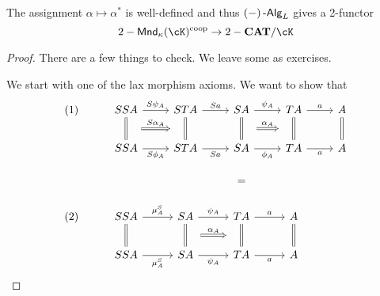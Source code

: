 \documentclass[a4paper,11pt,oneside,openany]{scrbook}
\begin{document}
\begin{prop}
    The assignment $\alpha\mapsto\alpha^*$ is well-defined and thus $(-)\operatorname{-\mathsf{Alg}}_L$
    gives a 2-functor
    \[2-\Mnd_\kappa(\cK)^{\text{coop}}\rightarrow 2-\CAT/\cK\]
\end{prop}
\begin{proof}
    There are a few things to check. We leave some as exercises.

    We start with one of the lax morphism axioms. We want to show that
    \[\begin{tikzcd}
        {(1)} & SSA & STA & SA & TA & A \\
        & SSA & STA & SA & TA & A \\
        &&& {=} \\
        {(2)} & SSA & SA & TA & A \\
        & SSA & SA & TA & A
        \arrow[""{name=0, anchor=center, inner sep=0}, Rightarrow, no head, from=1-4, to=2-4]
        \arrow[""{name=1, anchor=center, inner sep=0}, Rightarrow, no head, from=1-5, to=2-5]
        \arrow[Rightarrow, no head, from=1-6, to=2-6]
        \arrow["a", from=1-5, to=1-6]
        \arrow["a"', from=2-5, to=2-6]
        \arrow["{\psi_A}", from=1-4, to=1-5]
        \arrow["{\phi_A}"', from=2-4, to=2-5]
        \arrow["{S\psi_A}", from=1-2, to=1-3]
        \arrow["{S\phi_A}"', from=2-2, to=2-3]
        \arrow["Sa"', from=2-3, to=2-4]
        \arrow["Sa", from=1-3, to=1-4]
        \arrow[""{name=2, anchor=center, inner sep=0}, Rightarrow, no head, from=1-2, to=2-2]
        \arrow[""{name=3, anchor=center, inner sep=0}, Rightarrow, no head, from=1-3, to=2-3]
        \arrow[Rightarrow, no head, from=4-5, to=5-5]
        \arrow[""{name=4, anchor=center, inner sep=0}, Rightarrow, no head, from=4-4, to=5-4]
        \arrow[""{name=5, anchor=center, inner sep=0}, Rightarrow, no head, from=4-3, to=5-3]
        \arrow[Rightarrow, no head, from=4-2, to=5-2]
        \arrow["{\mu_A^S}", from=4-2, to=4-3]
        \arrow["{\psi_A}", from=4-3, to=4-4]
        \arrow["a", from=4-4, to=4-5]
        \arrow["a"', from=5-4, to=5-5]
        \arrow["{\psi_A}"', from=5-3, to=5-4]
        \arrow["{\mu^S_A}"', from=5-2, to=5-3]
        \arrow["{\alpha_A}", shorten <=13pt, shorten >=13pt, Rightarrow, from=0, to=1]
        \arrow["{S\alpha_A}", shorten <=13pt, shorten >=13pt, Rightarrow, from=2, to=3]
        \arrow["{\alpha_A}", shorten <=13pt, shorten >=13pt, Rightarrow, from=5, to=4]
    \end{tikzcd}\]


\end{proof}
\end{document}
